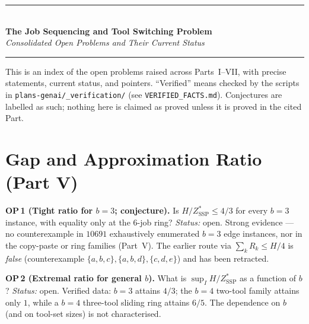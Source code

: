 \documentclass[11pt,a4paper]{article}
\newcommand{\ZSSP}{Z_{\mathrm{SSP}}^{*}}
\begin{document}
\begin{center}
  {\color{navyblue}\rule{\textwidth}{2pt}}\\[0.4cm]
  {\LARGE\bfseries\color{navyblue}The Job Sequencing and Tool Switching Problem}\\[0.3cm]
  {\large\itshape\color{midblue}Consolidated Open Problems and Their Current Status}\\[0.2cm]
  {\color{navyblue}\rule{\textwidth}{2pt}}
\end{center}

\vspace{0.3cm}
\begin{mdframed}[backgroundcolor=lightblue,linecolor=navyblue,linewidth=1pt,
  innerleftmargin=14pt,innerrightmargin=14pt,innertopmargin=8pt,innerbottommargin=8pt]
\small This is an index of the open problems raised across Parts~I--VII, with precise
statements, current status, and pointers. ``Verified'' means checked by the scripts in
\texttt{plans-genai/\_verification/} (see \texttt{VERIFIED\_FACTS.md}). Conjectures are
labelled as such; nothing here is claimed as proved unless it is proved in the cited Part.
\end{mdframed}

\vspace{0.3cm}

\section{Gap and Approximation Ratio (Part V)}

\begin{op}
\textbf{OP\,1 (Tight ratio for $b=3$; conjecture).} Is $H/\ZSSP \le 4/3$ for every
$b=3$ instance, with equality only at the $6$-job ring?
\emph{Status:} open. Strong evidence --- no counterexample in $10691$ exhaustively
enumerated $b=3$ edge instances, nor in the copy-paste or ring families (Part~V). The
earlier route via $\sum_k R_k \le H/4$ is \emph{false} (counterexample
$\{a,b,c\},\{a,b,d\},\{c,d,e\}$) and has been retracted.
\end{op}

\begin{op}
\textbf{OP\,2 (Extremal ratio for general $b$).} What is $\sup_I H/\ZSSP$ as a function
of $b$? \emph{Status:} open. Verified data: $b=3$ attains $4/3$; the $b=4$ two-tool
family attains only $1$, while a $b=4$ three-tool sliding ring attains $6/5$. The
dependence on $b$ (and on tool-set sizes) is not characterised.
\end{op}
\end{document}

